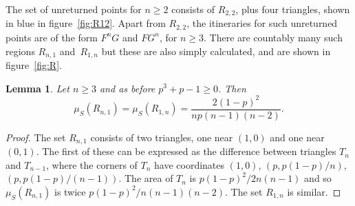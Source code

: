 \documentclass{iopart}
\newtheorem{lemma}{Lemma}
\begin{document}
The set of unreturned points for $n \ge 2$ consists of $R_{2,2}$, plus four triangles, shown in blue in figure~\ref{fig:R12}. Apart from $R_{2,2}$, the itineraries for such unreturned points are of the form $F^n G$ and $FG^n$, for $n \ge 3$. There are countably many such regions $R_{n,1}$ and~$R_{1,n}$ but these are also simply calculated, and are shown in figure~\ref{fig:R}.
\begin{lemma}\label{lem:Rcountable}
Let $n \ge 3$ and as before $p^3 + p - 1 \ge 0$. Then 
\begin{equation*}
\mu_S(R_{n,1}) = \mu_S(R_{1,n}) = \frac{2(1-p)^2}{np(n-1)(n-2)}.
\end{equation*}
\end{lemma}

\begin{proof}
The set $R_{n,1}$ consists of two triangles, one near $(1,0)$ and one near $(0,1)$. The first of these can be expressed as the difference between triangles $T_n$ and $T_{n-1}$, where the corners of $T_n$ have coordinates $(1,0)$, $(p,p(1-p)/n)$, $(p,p(1-p)/(n-1))$. The area of $T_n$ is $p(1-p)^2/2n(n-1)$ and so $\mu_S(R_{n,1})$ is twice $p(1-p)^2/n(n-1)(n-2)$. The set $R_{1,n}$ is similar.
\end{proof}
\end{document}
